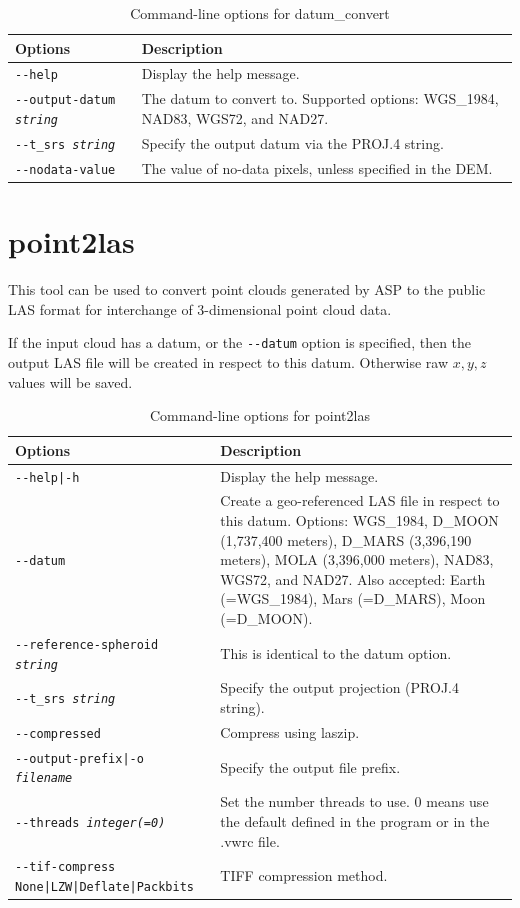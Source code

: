 \begin{longtable}{|l|p{10cm}|}
\caption{Command-line options for datum\_convert}
\label{tbl:datumconvert}
\endfirsthead
\endhead
\endfoot
\endlastfoot
\hline
Options & Description \\ \hline \hline
\texttt{-\/-help} & Display the help message.\\ \hline
\texttt{-\/-output-datum \textit{string}} & The datum to convert to. Supported options: WGS\_1984, NAD83, WGS72, and NAD27. \\ \hline
\texttt{-\/-t\_srs \textit{string}} & Specify the output datum via the PROJ.4 string. \\ \hline
\texttt{-\/-nodata-value} & The value of no-data pixels, unless specified in the DEM.\\ \hline
\end{longtable}


\section{point2las}
\label{point2las}

This tool can be used to convert point clouds generated by ASP to the
public LAS format for interchange of 3-dimensional point cloud data.

If the input cloud has a datum, or the \texttt{-\/-datum} option is specified,
then the output LAS file will be created in respect to this datum. Otherwise
raw $x,y,z$ values will be saved.

\begin{longtable}{|l|p{10cm}|}
\caption{Command-line options for point2las}
\label{tbl:point2las}
\endfirsthead
\endhead
\endfoot
\endlastfoot
\hline
Options & Description \\ \hline \hline
\texttt{-\/-help|-h} & Display the help message.\\ \hline
\texttt{-\/-datum} & Create a geo-referenced LAS file in respect to this datum. Options: WGS\_1984, D\_MOON (1,737,400 meters), D\_MARS (3,396,190 meters), MOLA (3,396,000 meters), NAD83, WGS72, and NAD27. Also accepted: Earth (=WGS\_1984), Mars (=D\_MARS), Moon (=D\_MOON). \\ \hline
\texttt{-\/-reference-spheroid \textit{string}} & This is identical to the datum option. \\ \hline
\texttt{-\/-t\_srs \textit{string}} & Specify the output projection (PROJ.4 string). \\ \hline
\texttt{-\/-compressed} &
Compress using laszip. \\ \hline
\texttt{-\/-output-prefix|-o \textit{filename}} & Specify the output file prefix. \\ \hline
\texttt{-\/-threads \textit{integer(=0)}} & Set the number threads to use. 0 means use the default defined in the program or in the .vwrc file.\\ \hline
\texttt{-\/-tif-compress None|LZW|Deflate|Packbits} & TIFF compression method.\\ \hline
\end{longtable}

